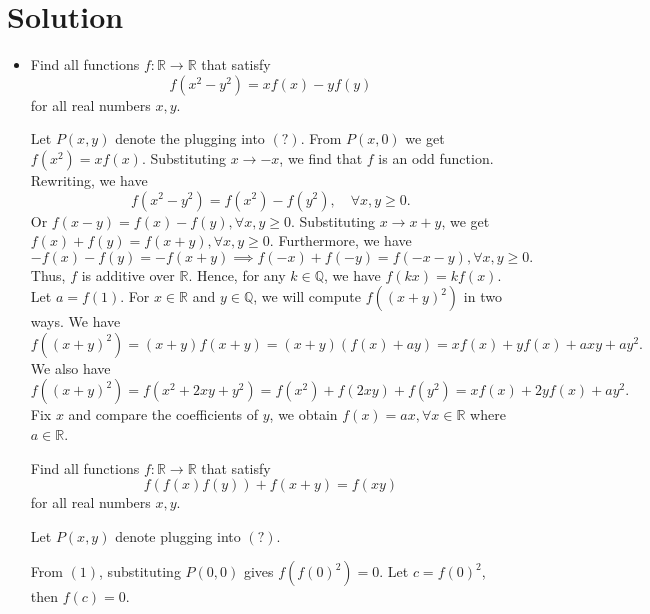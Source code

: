 \documentclass[11pt]{scrartcl}
\begin{document}
    \section{\LARGE Solution}
    \begin{itemize}[label=, leftmargin=0em, itemsep=0.2em]
    \item\begin{bt}
        Find all functions $f: \mathbb{R} \to \mathbb{R}$ that satisfy
        \[
           f(x^2 - y^2) = xf(x) - yf(y)
        \]
        for all real numbers $x,y$.
    \end{bt}
    \begin{sol}
        Let \( P(x, y) \) denote the plugging into \((?)\). From \( P(x, 0) \) we get \( f(x^2) = xf(x) \). Substituting \( x \to -x \), we find that \( f \) is an odd function. Rewriting, we have
            \[
            f(x^2 - y^2) = f(x^2) - f(y^2), \quad \forall x, y \geq 0.
            \]
            Or \( f(x - y) = f(x) - f(y), \forall x, y \geq 0 \). Substituting \( x \to x + y \), we get \( f(x) + f(y) = f(x + y), \forall x, y \geq 0 \). Furthermore, we have 
            \[
            -f(x) - f(y) = -f(x + y) \implies f(-x) + f(-y) = f(-x - y), \forall x, y \geq 0.
            \]
            Thus, \( f \) is additive over \(\mathbb{R}\). Hence, for any \( k \in \mathbb{Q} \), we have \( f(kx) = kf(x) \). Let \( a = f(1) \). For \( x \in \mathbb{R} \) and \( y \in \mathbb{Q} \), we will compute \( f((x + y)^2) \) in two ways. We have 
            \[
            f((x + y)^2) = (x + y)f(x + y) = (x + y)(f(x) + ay) = xf(x) + yf(x) + axy + ay^2.
            \]
            We also have 
            \[
            f((x + y)^2) = f(x^2 + 2xy + y^2) = f(x^2) + f(2xy) + f(y^2) = xf(x) + 2yf(x) + ay^2.
            \]
            Fix \( x \) and compare the coefficients of \( y \), we obtain \(\boxed{f(x) = ax, \forall x \in \mathbb{R}}\) where \( a \in \mathbb{R} \).
    \end{sol}
    \begin{bt}
        Find all functions $f: \mathbb{R} \to \mathbb{R}$ that satisfy
        \[
           f(f(x)f(y)) + f(x + y) = f(xy)\tag{1}
        \]
        for all real numbers $x,y$.
    \end{bt}
    \begin{sol}
            Let \( P(x, y) \) denote plugging into \((?)\).

            From \((1)\), substituting \( P(0,0) \) gives \( f(f(0)^2) = 0 \). Let \( c = f(0)^2 \), then \( f(c) = 0 \).
            

\end{sol}
\end{itemize}
\end{document}
